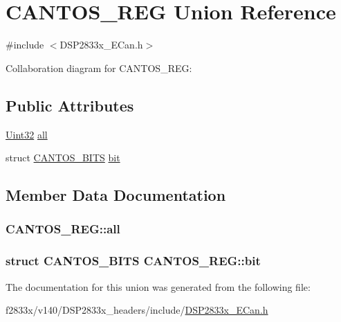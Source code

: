 \hypertarget{union_c_a_n_t_o_s___r_e_g}{}\section{C\+A\+N\+T\+O\+S\+\_\+\+R\+E\+G Union Reference}
\label{union_c_a_n_t_o_s___r_e_g}


{\ttfamily \#include $<$D\+S\+P2833x\+\_\+\+E\+Can.\+h$>$}



Collaboration diagram for C\+A\+N\+T\+O\+S\+\_\+\+R\+E\+G\+:
\subsection*{Public Attributes}
\begin{DoxyCompactItemize}
\item 
\hyperlink{_d_s_p2833x___device_8h_aba99025e657f892beb7ff31cecf64653}{Uint32} \hyperlink{union_c_a_n_t_o_s___r_e_g_af0c8eb258aadfc90e1934f96d0bd25df}{all}
\item 
struct \hyperlink{struct_c_a_n_t_o_s___b_i_t_s}{C\+A\+N\+T\+O\+S\+\_\+\+B\+I\+T\+S} \hyperlink{union_c_a_n_t_o_s___r_e_g_ab5b2c87054bb096ae208a99a7c7201fa}{bit}
\end{DoxyCompactItemize}


\subsection{Member Data Documentation}
\hypertarget{union_c_a_n_t_o_s___r_e_g_af0c8eb258aadfc90e1934f96d0bd25df}{}
\subsubsection[{all}]{ C\+A\+N\+T\+O\+S\+\_\+\+R\+E\+G\+::all}\label{union_c_a_n_t_o_s___r_e_g_af0c8eb258aadfc90e1934f96d0bd25df}
\hypertarget{union_c_a_n_t_o_s___r_e_g_ab5b2c87054bb096ae208a99a7c7201fa}{}
\subsubsection[{bit}]{\setlength{\rightskip}{0pt plus 5cm}struct {\bf C\+A\+N\+T\+O\+S\+\_\+\+B\+I\+T\+S} C\+A\+N\+T\+O\+S\+\_\+\+R\+E\+G\+::bit}\label{union_c_a_n_t_o_s___r_e_g_ab5b2c87054bb096ae208a99a7c7201fa}


The documentation for this union was generated from the following file\+:\begin{DoxyCompactItemize}
\item 
f2833x/v140/\+D\+S\+P2833x\+\_\+headers/include/\hyperlink{_d_s_p2833x___e_can_8h}{D\+S\+P2833x\+\_\+\+E\+Can.\+h}\end{DoxyCompactItemize}
